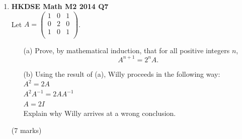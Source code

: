 \documentclass{report}
\begin{document}
\begin{enumerate}
\begin{enumerate}
		\begin{enumerate}
			\item [(i)]Prove that $\begin{vmatrix}
				p - \lambda_1 & q \\ 
				r & s - \lambda_1   \notag
				\end{vmatrix} = 0$ and $\begin{vmatrix}
				p - \lambda_2 & q \\ 
				r & s - \lambda_2   \notag
				\end{vmatrix} = 0$. 
			\item [(ii)]Prove that $\lambda_1$ and $\lambda_2$ are the roots of the equation $$\lambda^2 - \text{tr}(C) \cdot \lambda + |C| = 0.$$
		\end{enumerate}
		(5 marks)
		\item [(c)]Find the two values of $\lambda$ such that $A\begin{pmatrix}
			x\\y\\
		\end{pmatrix} = \lambda \begin{pmatrix}
			x\\y\\
		\end{pmatrix}$ for some non-zero matrices $\begin{pmatrix}
			x\\y\\
		\end{pmatrix}$. \\(2 marks)
	\end{enumerate}

	\item \textbf{HKDSE Math M2 2014 Q7}\\
	Let $A = \begin{pmatrix}
		1&0&1\\
		0&2&0\\
		1&0&1\\
	\end{pmatrix}$.
	\begin{enumerate}
		\item [(a)]Prove, by mathematical induction, that for all positive integers $n$, $$A^{n+1} = 2^nA.$$ 
		\item [(b)]Using the result of (a), Willy proceeds in the following way:\\
			$A^2 = 2A$\\
			$A^2 A^{-1}= 2AA^{-1}$\\
			$A = 2I$\\
			Explain why Willy arrives at a wrong conclusion.
	\end{enumerate}
	(7 marks)


\end{enumerate}
\end{document}
